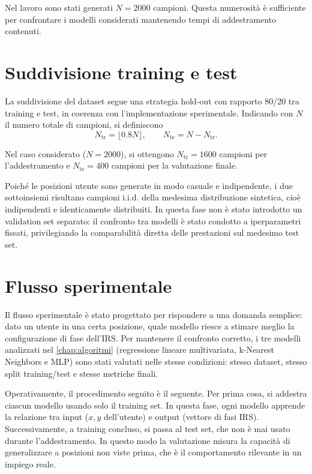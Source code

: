 \documentclass[12pt,a4paper]{report}
\begin{document}
Nel lavoro sono stati generati $N=2000$ campioni. Questa numerosità è
sufficiente per confrontare i modelli considerati mantenendo tempi di
addestramento contenuti.

\section{Suddivisione training e test}
La suddivisione del dataset segue una strategia hold-out con rapporto
80/20 tra training e test, in coerenza con l'implementazione
sperimentale. Indicando con $N$ il numero totale di campioni, si definiscono
\begin{equation}
  N_{\mathrm{tr}}=\lfloor 0.8N \rfloor,
  \qquad
  N_{\mathrm{te}}=N-N_{\mathrm{tr}}.
\end{equation}

Nel caso considerato ($N=2000$), si ottengono $N_{\mathrm{tr}}=1600$
campioni per l'addestramento e $N_{\mathrm{te}}=400$ campioni per la
valutazione finale.

Poiché le posizioni utente sono generate in modo casuale e
indipendente, i due sottoinsiemi risultano campioni i.i.d. della
medesima distribuzione sintetica, cioè indipendenti e identicamente
distribuiti. In questa fase non è stato introdotto un validation set
separato: il confronto tra modelli è stato condotto a iperparametri
fissati, privilegiando la comparabilità diretta delle prestazioni sul
medesimo test set.

\section{Flusso sperimentale}
Il flusso sperimentale è stato progettato per rispondere a una
domanda semplice: dato un utente in una certa posizione, quale
modello riesce a stimare meglio la configurazione di fase dell'IRS.
Per mantenere il confronto corretto, i tre modelli analizzati nel
\cref{chap:algoritmi} (regressione lineare multivariata, k-Nearest
Neighbors e MLP) sono stati valutati nelle stesse condizioni: stesso
dataset, stesso split training/test e stesse metriche finali.

Operativamente, il procedimento seguito è il seguente. Per prima
cosa, si addestra ciascun modello usando solo il training set. In
questa fase, ogni modello apprende la relazione tra input ($x,y$
dell'utente) e output (vettore di fasi IRS). Successivamente, a
training concluso, si passa al test set, che non è mai usato durante
l'addestramento. In questo modo la valutazione misura la capacità di
generalizzare a posizioni non viste prima, che è il comportamento
rilevante in un impiego reale.
\end{document}
